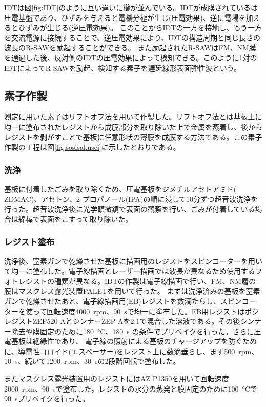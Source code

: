 \documentclass[dvipdfmx,11pt]{jsreport}
\numberwithin{equation}{chapter}
\numberwithin{table}{chapter}
\begin{document}
IDTは図\ref{fig:IDT}のように互い違いに櫛が並んでいる。IDTが成膜されているは圧電基盤であり、ひずみを与えると電機分極が生じ(圧電効果)、逆に電場を加えるとひずみが生じる(逆圧電効果)。
このことからIDTの一方を接地し、もう一方を交流電源に接続することで、逆圧電効果により、IDTの構造周期と同じ長さの波長のR-SAWを励起することができる。
また励起されたR-SAWはFM、NM膜を通過した後、反対側のIDTの圧電効果によって検知できる。このように1対のIDTによってR-SAWを励起、検知する素子を遅延線形表面弾性波という。
\subsection{素子作製}
測定に用いた素子はリフトオフ法を用いて作製した。リフトオフ法とは基板上に均一に塗布されたレジストから成膜部分を取り除いた上で金属を蒸着し、後からレジストを剥がすことで基板に任意形状の薄膜を成膜する方法である。この素子作製の工程は図\ref{fig:sosisakusei}に示したとおりである。
\subsubsection{洗浄}
基板に付着したごみを取り除くため、圧電基板をジメチルアセトアミド($\mathrm{ZDMAC}$)、アセトン、2-プロパノール(IPA)の順に浸して10分ずつ超音波洗浄を行った。超音波洗浄後に光学顕微鏡で表面の観察を行い、ごみが付着している場合は綿棒で表面をこすって取り除いた。
\subsubsection{レジスト塗布}
洗浄後、窒素ガンで乾燥させた基板に描画用のレジストをスピンコーターを用いて均一に塗布した。電子線描画とレーザー描画では波長が異なるため使用するフォトレジストの種類が異なる。IDTの作製は電子線描画で行い、FM、NM層の膜はマスクレス露光装置PALETを用いて行った。
まずは洗浄済みの基板を窒素ガンで乾燥させたあと、電子線描画用(EB)レジストを数滴たらし、スピンコーターを使って回転速度\SI{4000}{rpm}、\SI{90}{s}で均一に塗布した。EB用レジストはポジレジストZEP520-AとシンナーZEP-Aを2:1で混合した溶液である。その後シンナー除去や膜固定のために\SI{180}{\degreeCelsius}、\SI{180}{s}
の条件でプリベイクを行った。さらに圧電基板は絶縁性であり、
電子線の照射による基板のチャージアップを防ぐために、導電性コロイド(エスペーサー)をレジスト上に数滴垂らし、まず\SI{500}{rpm}、\SI{10}{s}、続いて\SI{1200}{rpm}、\SI{30}{s}の2段階回転で塗布した。

またマスクレス露光装置用のレジストにはAZ P1350を用いて回転速度\SI{2000}{rpm}、\SI{90}{s}で塗布した。レジストの水分の蒸発と膜固定のために\SI{100}{\degreeCelsius}で\SI{90}{s}プリベイクを行った。
\end{document}
